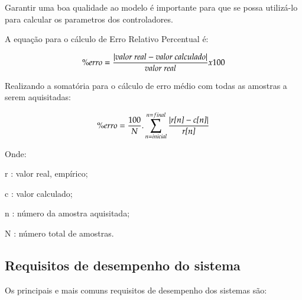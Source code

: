 Garantir uma boa qualidade ao modelo é importante para que se possa
utilizá-lo para calcular os parametros dos controladores.

A equação para o cálculo de Erro Relativo Percentual é:

\begin{equation}
 \% erro = \frac{| \text{\emph{valor real}} -\text{\emph{valor calculado}} |}{\text{\emph{valor real}}} x 100
\end{equation}

Realizando a somatória para o cálculo de erro médio com todas as
amostras a serem aquisitadas: 

\begin{equation}
 \% erro = \frac{100}{N} . \sum_{n = inicial}^{n = final} {\frac{| \text{\emph{r[n]}} -\text{\emph{c[n]}} |}{\text{\emph{r[n]}}} } 
\end{equation}


Onde:

\setlength{\parindent}{2cm}
r : valor real, empírico; 

c : valor calculado;

n : número da amostra aquisitada;

N : número total de amostras.




\subsection{ Requisitos de desempenho do sistema }

Os principais e mais comuns requisitos de desempenho dos sistemas são:


